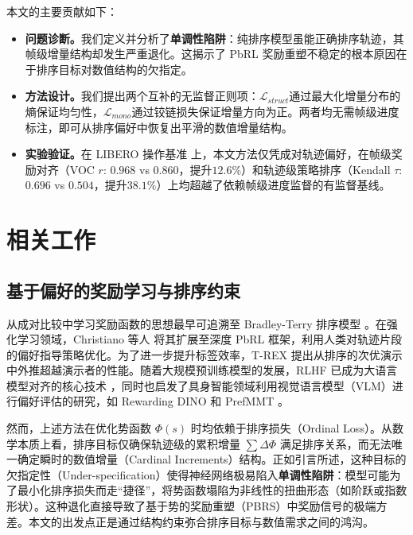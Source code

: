 本文的主要贡献如下：
\begin{itemize}[leftmargin=*,noitemsep]
    \item \textbf{问题诊断。}我们定义并分析了\textbf{单调性陷阱}：纯排序模型虽能正确排序轨迹，其帧级增量结构却发生严重退化。这揭示了 PbRL 奖励重塑不稳定的根本原因在于排序目标对数值结构的欠指定。
    \item \textbf{方法设计。}我们提出两个互补的无监督正则项：$\mathcal{L}_{struct}$通过最大化增量分布的熵保证均匀性，$\mathcal{L}_{mono}$通过铰链损失保证增量方向为正。两者均无需帧级进度标注，即可从排序偏好中恢复出平滑的数值增量结构。
    \item \textbf{实验验证。}在 LIBERO 操作基准 \cite{liu2023libero} 上，本文方法仅凭成对轨迹偏好，在帧级奖励对齐（VOC $r$: $0.968$ vs $0.860$，提升$12.6\%$）和轨迹级策略排序（Kendall $\tau$: $0.696$ vs $0.504$，提升$38.1\%$）上均超越了依赖帧级进度监督的有监督基线。
\end{itemize}

\section{相关工作}

\subsection{基于偏好的奖励学习与排序约束}

从成对比较中学习奖励函数的思想最早可追溯至 Bradley-Terry 排序模型 \cite{bradley1952}。在强化学习领域，Christiano 等人 \cite{christiano2017deep} 将其扩展至深度 PbRL 框架，利用人类对轨迹片段的偏好指导策略优化。为了进一步提升标签效率，T-REX \cite{brown2019extrapolating} 提出从排序的次优演示中外推超越演示者的性能。随着大规模预训练模型的发展，RLHF 已成为大语言模型对齐的核心技术 \cite{ouyang2022training}，同时也启发了具身智能领域利用视觉语言模型（VLM）进行偏好评估的研究，如 Rewarding DINO \cite{krack2026rewarding} 和 PrefMMT \cite{zhao2025}。

然而，上述方法在优化势函数 $\Phi(s)$ 时均依赖于排序损失（Ordinal Loss）。从数学本质上看，排序目标仅确保轨迹级的累积增量 $\sum \Delta\Phi$ 满足排序关系，而无法唯一确定瞬时的数值增量（Cardinal Increments）结构。正如引言所述，这种目标的欠指定性（Under-specification）使得神经网络极易陷入\textbf{单调性陷阱}：模型可能为了最小化排序损失而走“捷径”，将势函数塌陷为非线性的扭曲形态（如阶跃或指数形状）。这种退化直接导致了基于势的奖励重塑（PBRS）中奖励信号的极端方差。本文的出发点正是通过结构约束弥合排序目标与数值需求之间的鸿沟。

